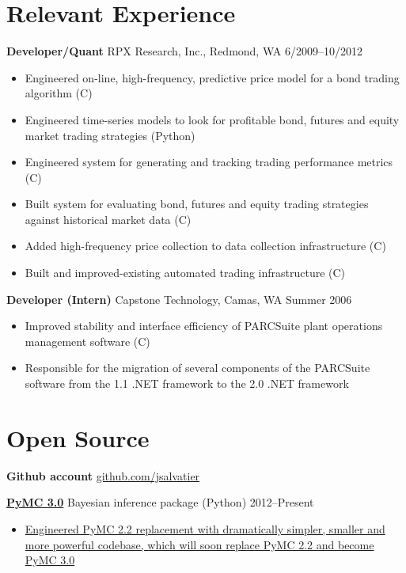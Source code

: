 \documentclass[margin]{res}
\newcommand{\bitem}{\begin{samepage}\begin{itemize} \itemsep -2pt}
\newcommand{\eitem}{\end{itemize}\end{samepage} }
\newcommand{\hrowbase}[3]{
  {\bf #1} #2 \hfill #3
}
\newcommand{\headrow}[3]{
  \hrowbase{#1}{#2}{#3}
    \vspace{6pt}
    \bitem
      }
\newcommand{\eheadrow}[0]{\eitem}
\newcommand{\CS}
{C\nolinebreak[4]\hspace{-.05em}\raisebox{.22ex}{\footnotesize\#}}
\begin{document}
 

\resumewidth=6.5in
\newsectionwidth{1.0in}
\begin{resume} 
 

\section{Relevant Experience}
  \headrow{Developer/Quant}{RPX Research, Inc., Redmond, WA}{6/2009--10/2012}
     \item Engineered on-line, high-frequency, predictive price model for a bond trading algorithm (\CS)
     \item Engineered time-series models to look for profitable bond, futures and equity market trading strategies (Python) 
     \item Engineered system for generating and tracking trading performance metrics (\CS)
     \item Built system for evaluating bond, futures and equity trading strategies against historical market data (\CS) 
     \item Added high-frequency price collection to data collection infrastructure (\CS)
     \item Built and improved-existing automated trading infrastructure (\CS)
  \eheadrow

  \headrow{Developer (Intern)}{Capstone Technology, Camas, WA}{Summer 2006}
    \item Improved stability and interface efficiency of PARCSuite plant operations management software (\CS)
    \item Responsible for the migration of several components of the PARCSuite software from the 1.1 .NET framework to the 2.0 .NET framework 
  \eheadrow

 \section{Open Source}
 {\bf Github account} \href{https://github.com/jsalvatier}{github.com/jsalvatier}

    \headrow{\href{https://github.com/pymc-devs/pymc/commits/pymc3\#readme}{PyMC 3.0}}{Bayesian inference package (Python)}{2012--Present}
      \item \href{https://github.com/pymc-devs/pymc/commits/pymc3}{Engineered PyMC 2.2 replacement with dramatically simpler, smaller and more powerful codebase, which will soon replace PyMC 2.2 and become PyMC 3.0}
    \eheadrow


\end{resume}
\end{document}
